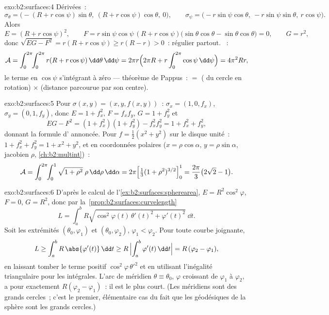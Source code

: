 \begin{solution}{exo:b2:surfaces:4}
Dérivées~:
\[
\sigma_\theta = \bigl(-(R + r\cos\psi)\sin\theta,\
(R + r\cos\psi)\cos\theta,\ 0\bigr),
\qquad
\sigma_\psi = \bigl(-r\sin\psi\cos\theta,\
-r\sin\psi\sin\theta,\ r\cos\psi\bigr).
\]
Alors
\[
E = (R + r\cos\psi)^2,
\qquad
F = r\sin\psi\cos\psi\,(R + r\cos\psi)
\bigl(\sin\theta\cos\theta - \sin\theta\cos\theta\bigr) = 0,
\qquad
G = r^2 ,
\]
donc $\sqrt{EG - F^2} = r(R + r\cos\psi) \geq r(R - r) > 0$~:
régulier partout. ~:
\[
\mathcal{A}
= \int_0^{2\pi}\!\!\int_0^{2\pi} r(R + r\cos\psi)
\,\dd\theta\,\dd\psi
= 2\pi r \Bigl(2\pi R + r\int_0^{2\pi}\cos\psi\,\dd\psi\Bigr)
= 4\pi^2 R r ,
\]
le terme en $\cos\psi$ s'intégrant à zéro --- théorème de Pappus~: 
$=$ ( du cercle en rotation) $\times$ (distance parcourue par
son centre).
\end{solution}

\begin{solution}{exo:b2:surfaces:5}
Pour $\sigma(x, y) = (x, y, f(x,y))$~: $\sigma_x = (1, 0, f_x)$,
$\sigma_y = (0, 1, f_y)$, donc $E = 1 + f_x^2$, $F = f_xf_y$, $G = 1
+ f_y^2$ et
\[
EG - F^2 = (1 + f_x^2)(1 + f_y^2) - f_x^2f_y^2
= 1 + f_x^2 + f_y^2 ,
\]
donnant la formule d' annoncée. Pour $f = \frac12(x^2 + y^2)$ sur
le disque unité~: $1 + f_x^2 + f_y^2 = 1 + x^2 + y^2$, et en
coordonnées polaires ($x = \rho\cos\alpha$, $y = \rho\sin\alpha$, jacobien
$\rho$, \cref{ch:b2:multint})~:
\[
\mathcal{A}
= \int_0^{2\pi}\!\!\int_0^1 \sqrt{1 + \rho^2}\;\rho
\,\dd\rho\,\dd\alpha
= 2\pi\Bigl[\tfrac13(1 + \rho^2)^{3/2}\Bigr]_0^1
= \frac{2\pi}{3}\bigl(2\sqrt2 - 1\bigr).
\]
\end{solution}

\begin{solution}{exo:b2:surfaces:6}
D'après le calcul de l'\cref{ex:b2:surfaces:spherearea}, $E =
R^2\cos^2\varphi$, $F = 0$, $G = R^2$, donc par la~\cref{prop:b2:surfaces:curvelength}
\[
L = \int_a^b R\sqrt{\cos^2\varphi(t)\,\theta'(t)^2
+ \varphi'(t)^2}\;\dd t .
\]
Soit les extrémités $(\theta_0, \varphi_1)$ et $(\theta_0,
\varphi_2)$, $\varphi_1 < \varphi_2$. Pour toute courbe joignante,
\[
L \geq \int_a^b R\,\abs{\varphi'(t)}\,\dd t
\geq R\,\Bigl|\int_a^b \varphi'(t)\,\dd t\Bigr|
= R\,(\varphi_2 - \varphi_1),
\]
en laissant tomber le terme positif $\cos^2\varphi\,\theta'^2$ et en utilisant
l'inégalité triangulaire pour les intégrales. L'arc de méridien
$\theta \equiv \theta_0$, $\varphi$ croissant de $\varphi_1$ à
$\varphi_2$, a pour \omterm{def:b2:curves:length}{longueur} exactement $R(\varphi_2 - \varphi_1)$~: il est
le plus court. (Les méridiens sont des grands cercles~; c'est le premier,
élémentaire cas du fait que les géodésiques de la sphère sont les grands
cercles.)
\end{solution}

